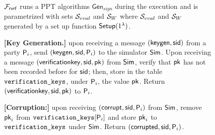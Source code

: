 
\newcommand{\Gen}{\ensuremath{\mathsf{Gen}}}

\newcommand{\anonymouskeymap}{\ensuremath{\mathtt{anonymous\_key\_map}}}
\newcommand{\anonymouskeylist}{\mathcal{W}}
\renewcommand{\sim}{\simulator}

\begin{figure}
\eprint{\footnotesize}{\scriptsize} 
\begin{tcolorbox}[left=2pt,right=2pt]
	{  $ \mathcal{F}_{\textsf{rvrf}} $ runs a PPT algorithms  $\Gen_{sign} $ during the execution and is parametrized with  sets $ {\mathcal{S}}_{eval} $ and $ {\mathcal{S}}_W $ where $ {\mathcal{S}}_{eval} $ and $ {\mathcal{S}}_W $ generated by a set up function $ \mathsf{Setup}(1^\lambda) $.
		
				
			\textbf{[Key Generation.]} upon receiving a message $(\mathsf{keygen}, \textsf{sid})$ from a party $\mathsf{P}_i$, send $(\mathsf{keygen}, \textsf{sid}, \mathsf{P}_i)$ to the simulator $\mathsf{Sim}$.
			Upon receiving a message $(\mathsf{verificationkey}, \textsf{sid}, \mathsf{pk})$ from $\mathsf{Sim}$, verify that $\mathsf{pk}$ has not been recorded before for $ \textsf{sid} $; then, store in the table $\texttt{verification\_keys}$, under $\mathsf{P}_i$, the value $\mathsf{pk}$.
			Return $(\mathsf{verificationkey}, \textsf{sid}, \mathsf{pk})$ to $ \mathsf{P}_i$.
				
				
			\textbf{[Corruption:] } 
			upon receiving $ (\mathsf{corrupt}, \textsf{sid}, \mathsf{P}_i) $ from $ \mathsf{Sim} $, remove $ \mathsf{pk}_i $ from $ \texttt{verification\_keys}[\mathsf{P}_i] $ and store $ \mathsf{pk}_i $ to $ \texttt{verification\_keys} $ under $ \sim $. Return $ (\mathsf{corrupted}, \textsf{sid},\mathsf{P}_i) $.
			
}
\end{tcolorbox}
\end{figure}
